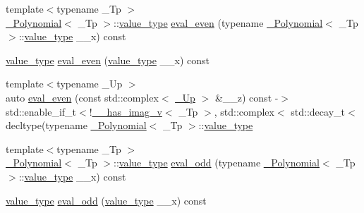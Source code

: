 \begin{DoxyCompactItemize}
{\footnotesize template$<$typename \+\_\+\+Tp $>$ }\\\hyperlink{class____gnu__cxx_1_1__Polynomial}{\+\_\+\+Polynomial}$<$ \+\_\+\+Tp $>$\+::\hyperlink{class____gnu__cxx_1_1__Polynomial_a725563351f50e76084a7a016c06f8a53}{value\+\_\+type} \hyperlink{class____gnu__cxx_1_1__Polynomial_a5e3d2496522f241c6fae41d222819a59}{eval\+\_\+even} (typename \hyperlink{class____gnu__cxx_1_1__Polynomial}{\+\_\+\+Polynomial}$<$ \+\_\+\+Tp $>$\+::\hyperlink{class____gnu__cxx_1_1__Polynomial_a725563351f50e76084a7a016c06f8a53}{value\+\_\+type} \+\_\+\+\_\+x) const
\item 
\hyperlink{class____gnu__cxx_1_1__Polynomial_a725563351f50e76084a7a016c06f8a53}{value\+\_\+type} \hyperlink{class____gnu__cxx_1_1__Polynomial_ac70ecc3968e15077ef2d68390d150f5a}{eval\+\_\+even} (\hyperlink{class____gnu__cxx_1_1__Polynomial_a725563351f50e76084a7a016c06f8a53}{value\+\_\+type} \+\_\+\+\_\+x) const
\item 
{\footnotesize template$<$typename \+\_\+\+Up $>$ }\\auto \hyperlink{class____gnu__cxx_1_1__Polynomial_a7314653c50b311781a26ac74789d84a1}{eval\+\_\+even} (const std\+::complex$<$ \hyperlink{class____gnu__cxx_1_1__Polynomial_a242114d4b86648a5dff67a8221f80d40}{\+\_\+\+Up} $>$ \&\+\_\+\+\_\+z) const -\/$>$ std\+::enable\+\_\+if\+\_\+t$<$!\hyperlink{namespace____gnu__cxx_afa2404a914b06f950f3a46e75aca51a9}{\+\_\+\+\_\+has\+\_\+imag\+\_\+v}$<$ \+\_\+\+Tp $>$, std\+::complex$<$ std\+::decay\+\_\+t$<$ decltype(typename \hyperlink{class____gnu__cxx_1_1__Polynomial}{\+\_\+\+Polynomial}$<$ \+\_\+\+Tp $>$\+::\hyperlink{class____gnu__cxx_1_1__Polynomial_a725563351f50e76084a7a016c06f8a53}{value\+\_\+type}
\item 
{\footnotesize template$<$typename \+\_\+\+Tp $>$ }\\\hyperlink{class____gnu__cxx_1_1__Polynomial}{\+\_\+\+Polynomial}$<$ \+\_\+\+Tp $>$\+::\hyperlink{class____gnu__cxx_1_1__Polynomial_a725563351f50e76084a7a016c06f8a53}{value\+\_\+type} \hyperlink{class____gnu__cxx_1_1__Polynomial_acd4fd2288b7dd7a5933e84ae372d4769}{eval\+\_\+odd} (typename \hyperlink{class____gnu__cxx_1_1__Polynomial}{\+\_\+\+Polynomial}$<$ \+\_\+\+Tp $>$\+::\hyperlink{class____gnu__cxx_1_1__Polynomial_a725563351f50e76084a7a016c06f8a53}{value\+\_\+type} \+\_\+\+\_\+x) const
\item 
\hyperlink{class____gnu__cxx_1_1__Polynomial_a725563351f50e76084a7a016c06f8a53}{value\+\_\+type} \hyperlink{class____gnu__cxx_1_1__Polynomial_aff02472cad1aa3b6c8d067fdd4b11bc0}{eval\+\_\+odd} (\hyperlink{class____gnu__cxx_1_1__Polynomial_a725563351f50e76084a7a016c06f8a53}{value\+\_\+type} \+\_\+\+\_\+x) const

\end{DoxyCompactItemize}

